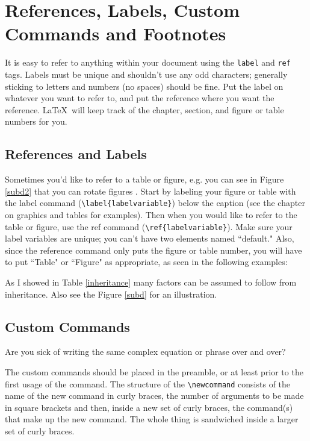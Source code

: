 \documentclass[12pt,twoside]{reedthesis}
\theoremstyle{plain}   %
\theoremstyle{definition}
\theoremstyle{remark}
\numberwithin{equation}{section}
\begin{document}
\section{References, Labels, Custom Commands and Footnotes}
It is easy to refer to anything within your document using the \texttt{label} and \texttt{ref} tags.  Labels must be unique and shouldn't use any odd characters; generally sticking to letters and numbers (no spaces) should be fine. Put the label on whatever you want to refer to, and put the reference where you want the reference. \LaTeX\ will keep track of the chapter, section, and figure or table numbers for you. 

\subsection{References and Labels}
Sometimes you'd like to refer to a table or figure, e.g. you can see in Figure \ref{subd2} that you can rotate figures . Start by labeling your figure or table with the label command (\verb=\label{labelvariable}=) below the caption (see the chapter on graphics and tables for examples). Then when you would like to refer to the table or figure, use the ref command (\verb=\ref{labelvariable}=). Make sure your label variables are unique; you can't have two elements named ``default." Also, since the reference command only puts the figure or table number, you will have to put  ``Table" or ``Figure" as appropriate, as seen in the following examples:

 As I showed in Table \ref{inheritance} many factors can be assumed to follow from inheritance. Also see the Figure \ref{subd} for an illustration.
 
\subsection{Custom Commands}\label{commands}
Are you sick of writing the same complex equation or phrase over and over? 

The custom commands should be placed in the preamble, or at least prior to the first usage of the command. The structure of the \verb=\newcommand= consists of the name of the new command in curly braces, the number of arguments to be made in square brackets and then, inside a new set of curly braces, the command(s) that make up the new command. The whole thing is sandwiched inside a larger set of curly braces. 

\newcommand{\hydro}{H$_2$SO$_4$}
\end{document}

